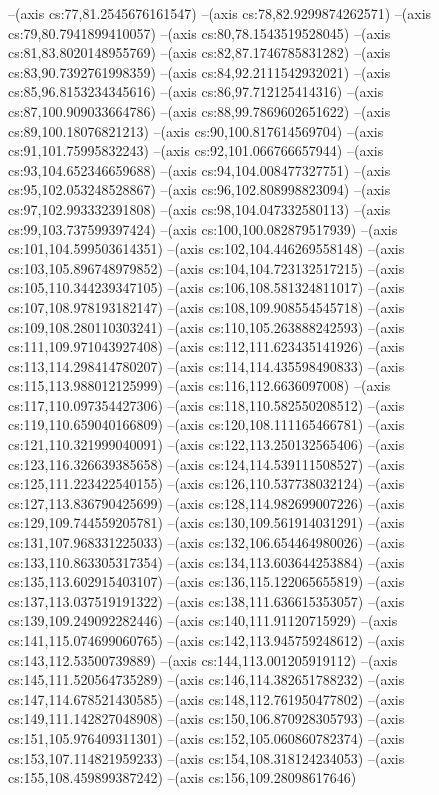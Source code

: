 --(axis cs:77,81.2545676161547)
--(axis cs:78,82.9299874262571)
--(axis cs:79,80.7941899410057)
--(axis cs:80,78.1543519528045)
--(axis cs:81,83.8020148955769)
--(axis cs:82,87.1746785831282)
--(axis cs:83,90.7392761998359)
--(axis cs:84,92.2111542932021)
--(axis cs:85,96.8153234345616)
--(axis cs:86,97.712125414316)
--(axis cs:87,100.909033664786)
--(axis cs:88,99.7869602651622)
--(axis cs:89,100.18076821213)
--(axis cs:90,100.817614569704)
--(axis cs:91,101.75995832243)
--(axis cs:92,101.066766657944)
--(axis cs:93,104.652346659688)
--(axis cs:94,104.008477327751)
--(axis cs:95,102.053248528867)
--(axis cs:96,102.808998823094)
--(axis cs:97,102.993332391808)
--(axis cs:98,104.047332580113)
--(axis cs:99,103.737599397424)
--(axis cs:100,100.082879517939)
--(axis cs:101,104.599503614351)
--(axis cs:102,104.446269558148)
--(axis cs:103,105.896748979852)
--(axis cs:104,104.723132517215)
--(axis cs:105,110.344239347105)
--(axis cs:106,108.581324811017)
--(axis cs:107,108.978193182147)
--(axis cs:108,109.908554545718)
--(axis cs:109,108.280110303241)
--(axis cs:110,105.263888242593)
--(axis cs:111,109.971043927408)
--(axis cs:112,111.623435141926)
--(axis cs:113,114.298414780207)
--(axis cs:114,114.435598490833)
--(axis cs:115,113.988012125999)
--(axis cs:116,112.6636097008)
--(axis cs:117,110.097354427306)
--(axis cs:118,110.582550208512)
--(axis cs:119,110.659040166809)
--(axis cs:120,108.111165466781)
--(axis cs:121,110.321999040091)
--(axis cs:122,113.250132565406)
--(axis cs:123,116.326639385658)
--(axis cs:124,114.539111508527)
--(axis cs:125,111.223422540155)
--(axis cs:126,110.537738032124)
--(axis cs:127,113.836790425699)
--(axis cs:128,114.982699007226)
--(axis cs:129,109.744559205781)
--(axis cs:130,109.561914031291)
--(axis cs:131,107.968331225033)
--(axis cs:132,106.654464980026)
--(axis cs:133,110.863305317354)
--(axis cs:134,113.603644253884)
--(axis cs:135,113.602915403107)
--(axis cs:136,115.122065655819)
--(axis cs:137,113.037519191322)
--(axis cs:138,111.636615353057)
--(axis cs:139,109.249092282446)
--(axis cs:140,111.91120715929)
--(axis cs:141,115.074699060765)
--(axis cs:142,113.945759248612)
--(axis cs:143,112.53500739889)
--(axis cs:144,113.001205919112)
--(axis cs:145,111.520564735289)
--(axis cs:146,114.382651788232)
--(axis cs:147,114.678521430585)
--(axis cs:148,112.761950477802)
--(axis cs:149,111.142827048908)
--(axis cs:150,106.870928305793)
--(axis cs:151,105.976409311301)
--(axis cs:152,105.060860782374)
--(axis cs:153,107.114821959233)
--(axis cs:154,108.318124234053)
--(axis cs:155,108.459899387242)
--(axis cs:156,109.28098617646)
